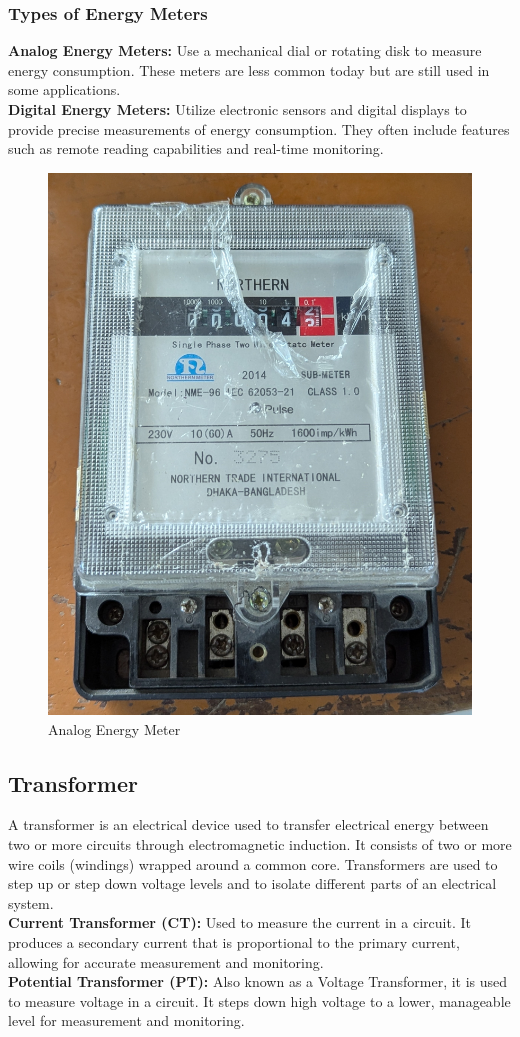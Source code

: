 \documentclass[a4paper,12pt]{article}
\begin{document}
	\subsubsection{Types of Energy Meters}
	\textbf{Analog Energy Meters:} Use a mechanical dial or rotating disk to measure energy consumption. These meters are less common today but are still used in some applications. \\
	\textbf{Digital Energy Meters:} Utilize electronic sensors and digital displays to provide precise measurements of energy consumption. They often include features such as remote reading capabilities and real-time monitoring.
	

	
	\begin{figure}[H]
		\centering
		\includegraphics[width=0.45\linewidth]{Images/17}
		\caption{Analog Energy Meter}
		\label{fig:4}
	\end{figure}
	\newpage
	\subsection{Transformer}
	A transformer is an electrical device used to transfer electrical energy between two or more circuits through electromagnetic induction. It consists of two or more wire coils (windings) wrapped around a common core. Transformers are used to step up or step down voltage levels and to isolate different parts of an electrical system.\\
	\textbf{Current Transformer (CT):} Used to measure the current in a circuit. It produces a secondary current that is proportional to the primary current, allowing for accurate measurement and monitoring. \\
	\textbf{Potential Transformer (PT):} Also known as a Voltage Transformer, it is used to measure voltage in a circuit. It steps down high voltage to a lower, manageable level for measurement and monitoring.
	
\end{document}

